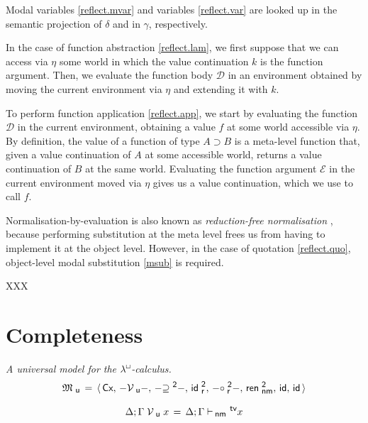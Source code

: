 \documentclass{entcs}
\numberwithin{equation}{thm}
\newcommand{\lambdabox}{\lambda^{\mkern-1mu\sq\mkern-2mu}}
\newcommand{\binop}[1]{-\mathord{#1}-}
\newcommand{\tsf}[1]{\textsf{\upshape{#1}}}
\newcommand{\stsf}[1]{\tsf{\small{#1}}}
\renewcommand{\:}{\mathrel{:}}
\newcommand{\id}{\operatorname{\tsf{id}}}
\newcommand{\0}{\varnothing}
\newcommand{\geqZ}{\mathrel{\supseteq^{\stsf{2}}}}
\newcommand{\ideZ}{\operatorname{\tsf{id}_{\stsf{r}}^{\stsf{2}}}}
\newcommand{\compeZ}{\mathrel{\circ_{\mkern-1mu\stsf{r}}^{\stsf{2}}}}
\newcommand{\tvar}{\operatorname{^{\stsf{tv}\mkern-4mu}}}
\newcommand{\imp}{\mathbin{\supset}}
\newcommand{\sq}{\Box}
\newcommand{\Cx}{\tsf{Cx}}
\newcommand{\D}{\mathcal{D}}
\newcommand{\E}{\mathcal{E}}
\newcommand{\enm}{\mathrel{\vdash_{\mkern-2mu\stsf{nm}}}}
\newcommand{\rennmZ}{\operatorname{\tsf{ren}_{\stsf{nm}}^{\stsf{2}}}}
\newcommand{\Mu}{\mathfrak{M}_{\stsf{u}}}
\newcommand{\Vu}{\mathrel{\mathcal{V}_{\stsf{u}}}}
\begin{document}
Modal variables \eqref{reflect.mvar} and variables \eqref{reflect.var} are looked up in the semantic projection of $\delta$ and in $\gamma$, respectively.

In the case of function abstraction \eqref{reflect.lam}, we first suppose that we can access via $\eta$ some world in which the value continuation $k$ is the function argument.  Then, we evaluate the function body $\D$ in an environment obtained by moving the current environment via $\eta$ and extending it with $k$.

To perform function application \eqref{reflect.app}, we start by evaluating the function $\D$ in the current environment, obtaining a value $f$ at some world accessible via $\eta$.  By definition, the value of a function of type $A \imp B$ is a meta-level function that, given a value continuation of $A$ at some accessible world, returns a value continuation of $B$ at the same world.  Evaluating the function argument $\E$ in the current environment moved via $\eta$ gives us a value continuation, which we use to call $f$.

Normalisation-by-evaluation is also known as \emph{reduction-free normalisation} \cite{AltenkirchHS1995,Danvy2005}, because performing substitution at the meta level frees us from having to implement it at the object level.  However, in the case of quotation \eqref{reflect.quo}, object-level modal substitution \eqref{msub} is required.

XXX

\lipsum[1]


\section{Completeness}

\begin{definition}
  \label{Mu}
  \emph{A universal model for the $\lambdabox$-calculus.}
  \begin{gather*}
    \Mu \,=\, \langle\,\Cx,\,\binop{\Vu},\,\binop{\geqZ},\,\ideZ,\,\binop{\compeZ},\,\rennmZ,\,\id,\,\id\,\rangle\\[0.5\baselineskip]
    \Delta; \Gamma \Vu x \,=\, \Delta; \Gamma \enm \mkern-4mu \tvar x
  \end{gather*}
\end{definition}
\end{document}
